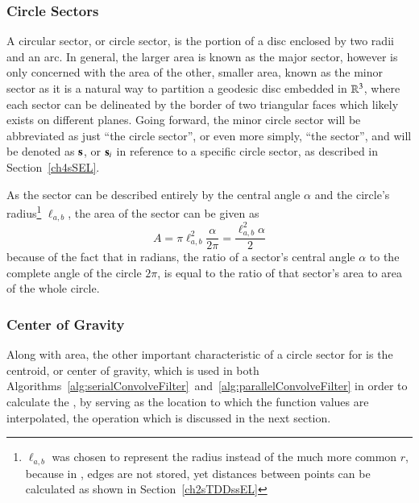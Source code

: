 %
%
\subsubsection{Circle Sectors}
\label{ch2sETBssGsssCS}
A circular sector, or circle sector, is the portion of a disc enclosed by two radii and an arc. In general, the larger area is known as the major sector, however  is only concerned with the area of the other, smaller area, known as the minor sector as it is a natural way to partition a geodesic disc embedded in $\mathbb{R}^{3}$, where each sector can be delineated by the border of two triangular faces which likely exists on different planes. Going forward, the minor circle sector will be abbreviated as just ``the circle sector'', or even more simply, ``the \gls{sector}'', and will be denoted as $\mathbf{s}$, or $\mathbf{s}_i$ in reference to a specific circle sector, as described in Section~\ref{ch4sSEL}.%
%
%

As the sector can be described entirely by the central angle $\alpha$ and the circle's radius\footnote{$\ell_{a,b}$ was chosen to represent the radius instead of the much more common $r$, because in \tdd{}, edges are not stored, yet distances between points can be calculated as shown in Section~\ref{ch2sTDDssEL}} $\ell_{a,b}$, the area of the sector can be given as
%
\begin{equation}
	A = \pi \ell_{a,b}^2\frac{\alpha}{2\pi} = \frac{\ell_{a,b}^2\alpha}{2}
	\label{eq:areaOfCircleSector}
\end{equation}
%
because of the fact that in radians, the ratio of a sector's central angle $\alpha$ to the complete angle of the circle $2\pi$, is equal to the ratio of that sector's area to area of the whole circle.~\cite{Weisstein19d}%
%

%
%
\subsubsection{Center of Gravity}
\label{ch2sEBTssGsssCG}
Along with area, the other important characteristic of a circle sector for  is the centroid, or center of gravity, which is used in both Algorithms~\ref{alg:serialConvolveFilter}~and~\ref{alg:parallelConvolveFilter} in order to calculate the , by serving as the location to which the function values are interpolated, the operation which is discussed in the next section.

